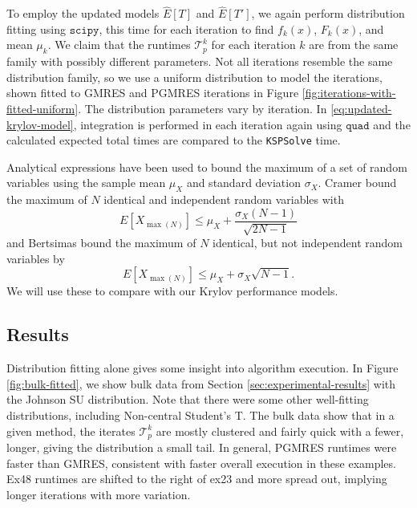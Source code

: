 \documentclass[sigconf]{acmart}
\begin{document}
To employ the updated models $\widehat{E}[T]$ and $\widehat{E}[T']$, we again perform distribution fitting using ${\texttt{scipy}}$, this time for each iteration to find  $f_k(x)$, $F_k(x)$, and mean $\mu_k$.
We claim that the runtimes $\mathcal{T}^k_p$ for each iteration $k$ are from the same family with possibly different parameters. 
Not all iterations resemble the same distribution family, so we use a uniform distribution to model the iterations, shown fitted to GMRES and PGMRES iterations in Figure \ref{fig:iterations-with-fitted-uniform}. 
The distribution parameters vary by iteration.
In \eqref{eq:updated-krylov-model}, integration is performed in each iteration again using ${\texttt{quad}}$ and the calculated expected total times are compared to the \texttt{KSPSolve} time.

Analytical expressions have been used \cite{seelam2010extreme} to bound the maximum of a set of random variables using the sample mean $\mu_X$ and standard deviation $\sigma_X$.  Cramer \cite{cramer2016mathematical, david2004order} bound the maximum of $N$ identical and independent random variables  with
\begin{equation}
E[X_{\max{(N)}}] \leq \mu_X + \frac{\sigma_X (N-1)}{\sqrt{2N-1}}
\end{equation}
and Bertsimas \cite{bertsimas2006tight} bound the maximum of $N$ identical, but not independent random variables by
\begin{equation}
E[X_{\max{(N)}}] \leq \mu_X + \sigma_X \sqrt{N-1}.
\end{equation}
We will use these to compare with our Krylov performance models.

\subsection{Results}

Distribution fitting alone gives some insight into algorithm execution. 
In Figure \ref{fig:bulk-fitted}, we show bulk data from Section \ref{sec:experimental-results} with the Johnson SU distribution. Note that there were some other well-fitting distributions, including Non-central Student's T.
The bulk data show that in a given method, the iterates $\mathcal{T}^k_p$ are mostly clustered and fairly quick with a fewer, longer, giving the distribution a small tail.
In general, PGMRES runtimes were faster than GMRES, consistent with faster overall execution in these examples. Ex48 runtimes are shifted to the right of ex23 and more spread out, implying longer iterations with more variation. 
\end{document}
